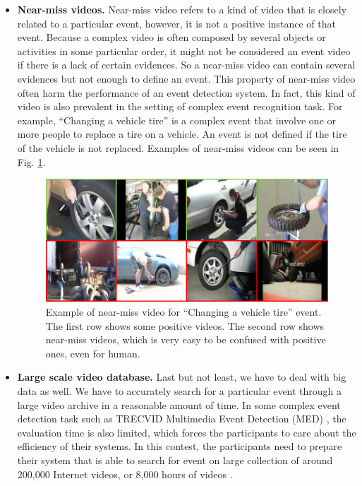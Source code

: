 \begin{itemize}
	\item{\textbf{Near-miss videos.}} Near-miss video refers to a kind of video that is closely related to a particular event, however, it is not a positive instance of that event. Because a complex video is often composed by several objects or activities in some particular order, it might not be considered an event video if there is a lack of certain evidences. So a near-miss video can contain several evidences but not enough to define an event. This property of near-miss video often harm the performance of an event detection system. In fact, this kind of video is also prevalent in the setting of complex event recognition task. For example, ``Changing a vehicle tire'' is a complex event that involve one or more people to replace a tire on a vehicle. An event is not defined if the tire of the vehicle is not replaced. Examples of near-miss videos can be seen in Fig. \ref{c1_nearmiss}.
	
	\begin{figure}
		\centering
		\includegraphics[width=1\textwidth]{near_miss.png}
		\caption{Example of near-miss video for ``Changing a vehicle tire'' event. The first row shows some positive videos. The second row shows near-miss videos, which is very easy to be confused with positive ones, even for human.}
		\label{c1_nearmiss}
	\end{figure}
		
	\item{\textbf{Large scale video database.}} Last but not least, we have to deal with big data as well. We have to accurately search for a particular event through a large video archive in a reasonable amount of time. In some complex event detection task such as  TRECVID Multimedia Event Detection (MED) \cite{over2014trecvid}, the evaluation time is also limited, which forces the participants to care about the efficiency of their systems. In this contest, the participants need to prepare their system that is able to search for event on large collection of around 200,000 Internet videos, or 8,000 hours of videos \cite{over2014trecvid}.
	
\end{itemize}

